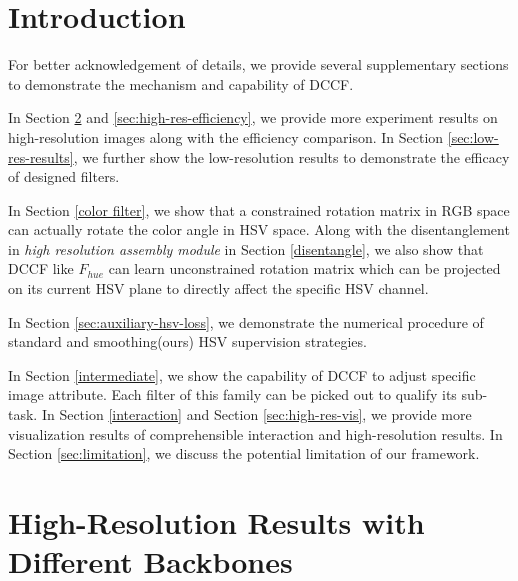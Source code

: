 \documentclass[runningheads]{llncs}
\begin{document}
\maketitle

\section{Introduction}


For better acknowledgement of details, we provide several supplementary sections to demonstrate the mechanism and capability of DCCF.

In Section \ref{sec:high-res-result} and \ref{sec:high-res-efficiency}, we provide more experiment results on high-resolution images along with the efficiency comparison.
In Section \ref{sec:low-res-results}, we further show the low-resolution results to demonstrate the efficacy of designed filters. 

In Section \ref{color filter}, we show that a constrained rotation matrix in RGB space can actually rotate the color angle in HSV space. 
Along with the disentanglement in \textit{high resolution assembly module} in Section \ref{disentangle}, we also show that DCCF like $F_{hue}$ can learn unconstrained rotation matrix which can be projected on its current HSV plane to directly affect the specific HSV channel.

In Section \ref{sec:auxiliary-hsv-loss}, we demonstrate the numerical procedure of standard and smoothing(ours) HSV supervision strategies.

In Section \ref{intermediate}, we show the capability of DCCF to adjust specific image attribute. 
Each filter of this family can be picked out to qualify its sub-task.
In Section \ref{interaction} and Section \ref{sec:high-res-vis}, we provide more visualization results of comprehensible interaction and high-resolution results.
In Section \ref{sec:limitation}, we discuss the potential limitation of our framework.


\section{High-Resolution Results with Different Backbones}
\label{sec:high-res-result}
\end{document}
